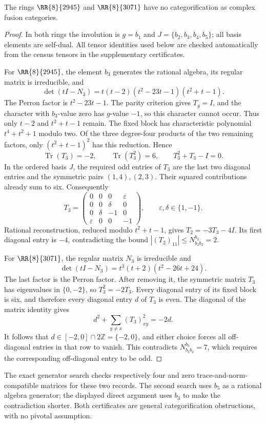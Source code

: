 \begin{proposition}\label{prop:two-four-fixed-exclusions}
The rings $\RR{8}{2945}$ and $\RR{8}{3071}$ have no categorification
as complex fusion categories.
\end{proposition}
\begin{proof}
In both rings the involution is $g=b_1$ and
$J=\{b_2,b_3,b_4,b_5\}$; all basis elements are self-dual.
All tensor identities used below are checked automatically from the
census tensors in the supplementary certificates.

For $\RR{8}{2945}$, the element $b_3$ generates the rational algebra,
its regular matrix is irreducible, and
\[
 \det(tI-N_3)=t(t-2)(t^2-23t-1)(t^2+t-1).
\]
The Perron factor is $t^2-23t-1$. The parity criterion gives $T_g=I$,
and the character with $b_3$-value zero has $g$-value $-1$, so this
character cannot occur. Thus only $t-2$ and $t^2+t-1$ remain.
The fixed block has characteristic polynomial
$t^4+t^2+1$ modulo two. Of the three degree-four products of the two
remaining factors, only $(t^2+t-1)^2$ has this reduction. Hence
\[
 \operatorname{Tr}(T_3)=-2,\qquad
 \operatorname{Tr}(T_3^2)=6,\qquad T_3^2+T_3-I=0.
\]
In the ordered basis $J$, the required odd entries of $T_3$ are the
last two diagonal entries and the symmetric pairs $(1,4),(2,3)$.
Their squared contributions already sum to six. Consequently
\[
 T_3=\begin{pmatrix}
 0&0&0&\varepsilon\\
 0&0&\delta&0\\
 0&\delta&-1&0\\
 \varepsilon&0&0&-1
 \end{pmatrix},\qquad \varepsilon,\delta\in\{1,-1\}.
\]
Rational reconstruction, reduced modulo $t^2+t-1$, gives
$T_2=-3T_3-4I$. Its first diagonal entry is $-4$, contradicting the
bound $|(T_2)_{11}|\leq N_{b_2b_2}^{b_2}=2$.

For $\RR{8}{3071}$, the regular matrix $N_3$ is irreducible and
\[
 \det(tI-N_3)=t^3(t+2)(t^2-26t+24).
\]
The last factor is the Perron factor. After removing it, the symmetric
matrix $T_3$ has eigenvalues in $\{0,-2\}$, so $T_3^2=-2T_3$.
Every diagonal entry of its fixed block is six, and therefore every
diagonal entry $d$ of $T_3$ is even. The diagonal of the matrix identity
gives
\[
 d^2+\sum_{y\ne x}(T_3)_{xy}^2=-2d.
\]
It follows that $d\in[-2,0]\cap2\mathbb Z=\{-2,0\}$, and either
choice forces all off-diagonal entries in that row to vanish. This
contradicts $N_{b_3b_2}^{b_3}=7$, which requires the corresponding
off-diagonal entry to be odd.
\end{proof}

The exact generator search checks respectively four and zero
trace-and-norm-compatible matrices for these two records. The second
search uses $b_5$ as a rational algebra generator; the displayed direct
argument uses $b_3$ to make the contradiction shorter. Both certificates
are general categorification obstructions, with no pivotal assumption.
